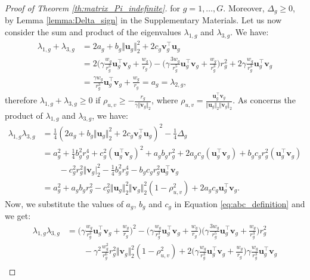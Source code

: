 \documentclass[10pt,a4paper]{amsart}
\newcommand{\T}{\top}
\def\bu{\boldsymbol{u}}
\def\bv{\boldsymbol{v}}
\begin{document}
\begin{proof}[Proof of Theorem \ref{th:matrix_Pi_indefinite}]
for $g=1,\dots,G$. Moreover, $\Delta_g\geq0$, by Lemma \ref{lemma:Delta_sign} in the Supplementary Materials. Let us now consider the sum and product of the eigenvalues $\lambda_{1,g}$ and $\lambda_{3,g}$. We have:
\begin{equation}
\label{eq:lambda1_plus_lambda3_is_lambda2}
\begin{aligned}
\lambda_{1,g}+\lambda_{3,g}&=2 a_g+b_g \Vert\bu_g\Vert_2^2+2 c_g \bv_g^{\T}\bu_g\\
&=2\Big(\gamma\frac{w_g}{r_g^3}\bu_g^{\T}\bv_g+\frac{w_g}{r_g}\Big)-\Big(\gamma\frac{3w_g}{r_g^5}\bu_g^{\T}\bv_g+\frac{w_g}{r_g^3}\Big)r_g^2+2\gamma\frac{w_g}{r_g^3}\bu_g^{\T}\bv_g\\
&=\frac{\gamma w_g}{r_g^3}\bu_g^{\T}\bv_g+\frac{w_g}{r_g}=a_g=\lambda_{2,g},
\end{aligned}
\end{equation}
therefore $\lambda_{1,g}+\lambda_{3,g}\geq0$ if $\rho_{u,v}\geq-\frac{r_g}{\gamma\Vert\bv_g\Vert_2}$, where $\rho_{u,v}=\frac{\bu_g^{\T}\bv_g}{\Vert\bu_g\Vert_2\Vert\bv_g\Vert_2}$. As concerns the product of $\lambda_{1,g}$ and $\lambda_{3,g}$, we have:
\begin{equation*}
\begin{aligned}
\lambda_{1,g}\lambda_{3,g}&=\frac{1}{4}(2 a_g+b_g \Vert\bu_g\Vert_2^2+2 c_g \bv_g^{\T}\bu_g)^2 - \frac{1}{4}\Delta_g\\
&=a_g^2+\frac{1}{4}b_g^2r_g^4+c_g^2(\bu_g^{\T}\bv_g)^2+a_gb_gr_g^2+2a_gc_g(\bu_g^{\T}\bv_g)+b_gc_gr_g^2(\bu_g^{\T}\bv_g)\\
&\qquad-c_g^2r_g^2\Vert\bv_g\vert_2^2-\frac{1}{4}b_g^2r_g^4-b_gc_gr_g^2\bu_g^{\T}\bv_g\\
&= a_g^2+a_gb_gr_g^2-c_g^2\Vert\bu_g\Vert_2^2\Vert\bv_g\Vert_2^2(1-\rho_{u,v}^2)+2a_gc_g\bu_g^{\T}\bv_g.
\end{aligned}
\end{equation*}
Now, we substitute the values of $a_g$, $b_g$ and $c_g$ in Equation \eqref{eq:abc_definition} and we get:
\begin{equation*}
\begin{aligned}
\lambda_{1,g}\lambda_{3,g}&=\Big(\gamma\frac{w_g}{r_g^3}\bu_g^{\T}\bv_g+\frac{w_g}{r_g}\Big)^2-\Big(\gamma\frac{w_g}{r_g^3}\bu_g^{\T}\bv_g+\frac{w_g}{r_g}\Big)\Big(\gamma\frac{3w_g}{r_g^5}\bu_g^{\T}\bv_g+\frac{w_g}{r_g^3}\Big)r_g^2\\
&\qquad-\gamma^2\frac{w_g^2}{r_g^6}r_g^2\Vert\bv_g\Vert_2^2(1-\rho_{u,v}^2)+2\Big(\gamma\frac{w_g}{r_g^3}\bu_g^{\T}\bv_g+\frac{w_g}{r_g}\Big)\gamma\frac{w_g}{r_g^3}\bu_g^{\T}\bv_g\\

\end{aligned}
\end{equation*}
\end{proof}
\end{document}

